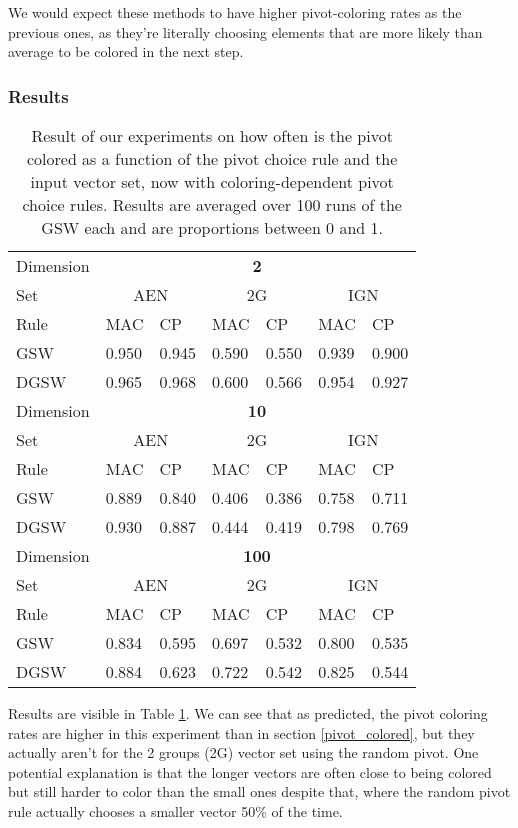 \documentclass[12pt]{article}
\begin{document}
We would expect these methods to have higher pivot-coloring rates as the previous ones, as they're literally choosing elements that are more likely than average to be colored in the next step.
\subsubsection{Results}
\begin{center}
\begin{table}[h]
\begin{tabular}{l|ll|ll|ll}
Dimension &\multicolumn{6}{c}{\textbf{2}}\\
Set  & \multicolumn{2}{c}{AEN} & \multicolumn{2}{c}{2G} & \multicolumn{2}{c}{IGN} \\
Rule &MAC&CP&MAC&CP&MAC&CP\\ \hline
GSW  &0.950&0.945&0.590&0.550&0.939&0.900\\
DGSW  &0.965&0.968&0.600&0.566&0.954&0.927\\
\hline
\hline
Dimension &\multicolumn{6}{c}{\textbf{10}}\\
Set  & \multicolumn{2}{c}{AEN} & \multicolumn{2}{c}{2G} & \multicolumn{2}{c}{IGN} \\
Rule &MAC&CP&MAC&CP&MAC&CP\\ \hline
GSW  &0.889&0.840&0.406&0.386&0.758&0.711\\
DGSW  &0.930&0.887&0.444&0.419&0.798&0.769\\
\hline
\hline
Dimension &\multicolumn{6}{c}{\textbf{100}}\\
Set  & \multicolumn{2}{c}{AEN} & \multicolumn{2}{c}{2G} & \multicolumn{2}{c}{IGN} \\
Rule &MAC&CP&MAC&CP&MAC&CP\\ \hline
GSW  &0.834&0.595&0.697&0.532&0.800&0.535\\
DGSW  &0.884&0.623&0.722&0.542&0.825&0.544\\
\end{tabular}
\caption{Result of our experiments on how often is the pivot colored as a function of the pivot choice rule and the input vector set, now with coloring-dependent pivot choice rules. Results are averaged over 100 runs of the GSW each and are proportions between 0 and 1.}
\label{pivot_colored_coloring_rules_results}
\end{table}
\end{center}
Results are visible in Table \ref{pivot_colored_coloring_rules_results}. We can see that as predicted, the pivot coloring rates are higher in this experiment than in section \ref{pivot_colored}, but they actually aren't for the 2 groups (2G) vector set using the random pivot. One potential explanation is that the longer vectors are often close to being colored but still harder to color than the small ones despite that, where the random pivot rule actually chooses a smaller vector 50\% of the time. 
\end{document}
